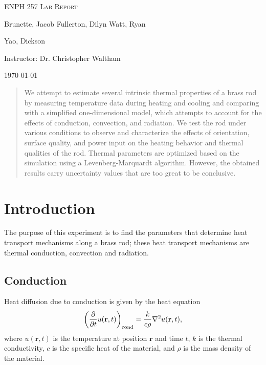 \documentclass[letterpaper,titlepage,oneside]{report}
\begin{document}
\begin{titlepage}
  \centering
  \vspace*{\fill}
  {\huge\scshape ENPH 257 Lab Report\par}
  \vspace{1cm}
  {\large Brunette, Jacob\quad}
  {\large Fullerton, Dilyn\quad}
  {\large Watt, Ryan\quad}
  {\large Yao, Dickson\par}
  \vspace{1cm}
  {\large Instructor: Dr. Christopher Waltham\par}
  \vspace{1cm}
  {\large \today\par}
  \vspace*{\fill}
  \vfill
\end{titlepage}

\begin{abstract}
  We attempt to estimate several intrinsic thermal properties of a
  brass rod by measuring temperature data during heating and cooling
  and comparing with a simplified one-dimensional model, which
  attempts to account for the effects of conduction, convection,
  and radiation.
  We test the rod under various conditions to observe and characterize
  the effects of orientation, surface quality, and power input on
  the heating behavior and thermal qualities of the rod.
  Thermal parameters are optimized based on the simulation using a
  Levenberg-Marquardt algorithm.
  However, the obtained results carry uncertainty
  values that are too great to be conclusive.
\end{abstract}

\tableofcontents

\chapter{Introduction}
\label{ch:intro}
The purpose of this experiment is to find the parameters that
determine heat transport mechanisms along a brass rod;
these heat transport mechanisms are thermal conduction,
convection and radiation.

\section{Conduction}
Heat diffusion due to conduction is given by the heat equation
\begin{equation}\label{eq:duconduction}
  \left(\frac{\partial}{\partial t}u(\mathbf{r},t)\right)_{\rm{cond}} =
  \frac{k}{c\rho}\nabla^2u(\mathbf{r}, t),
\end{equation}
where $u(\mathbf{r},t)$ is the temperature at position $\mathbf{r}$
and time $t$, $k$ is the thermal conductivity, $c$ is the specific
heat of the material, and $\rho$ is the mass density of the material.
\end{document}
